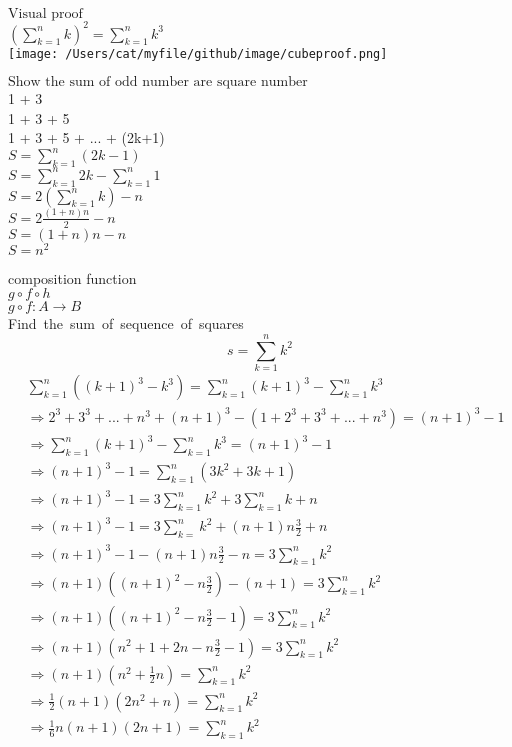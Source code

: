 \documentclass[10pt]{article}
\begin{document}
\begin{flushleft}
$\text{Visual proof}$\\
$ (\sum_{k=1}^{n} k)^{2} = \sum_{k=1}^{n} k^{3}$\\
\texttt{[image: /Users/cat/myfile/github/image/cubeproof.png]}
\end{flushleft}

\begin{flushleft}
$\text{Show the sum of odd number are square number}$
\\
1 + 3\\
1 + 3 + 5 \\
1 + 3 + 5 + ... + (2k+1) \\
\medskip
$S = \sum_{k=1}^{n} (2k-1)$ \\
$S = \sum_{k=1}^{n} 2k - \sum_{k=1}^{n} 1$ \\
$S = 2(\sum_{k=1}^{n} k) - n $ \\
$S = 2 \frac{(1+n)n}{2} - n$ \\
$S = (1+n)n - n$ \\
$S = n^2 $ \\
\end{flushleft}

composition function \\
$g \circ f \circ h $ \\
$g \circ f \colon A\to B$ \\

\pagebreak
\mbox{Find the sum of sequence of squares}
    \[ s = \sum_{k=1}^{n} k^2 \]
\begin{equation}
\begin{aligned}
    & \sum_{k=1}^{n} ((k+1)^3-k^3) = \sum_{k=1}^{n} (k+1)^3 - \sum_{k=1}^{n} k^3  \\
    & \Rightarrow 2^3 + 3^3 + ... + n^3 + (n+1)^3 - (1 + 2^3 + 3^3 + ... + n^3) = (n+1)^3 -1  \\
    & \Rightarrow  \sum_{k=1}^{n}(k+1)^3 - \sum_{k=1}^{n}k^3 =(n+1)^3 - 1  \\
    & \Rightarrow (n+1)^3-1 = \sum_{k=1}^{n}(3k^2+3k+1)   \\
    & \Rightarrow (n+1)^3-1 = 3\sum_{k=1}^{n} k^2 +  3\sum_{k=1}^{n} k + n   \\
    & \Rightarrow (n+1)^3-1 = 3\sum_{k=}^{n} k^2 + (n+1) n \frac{3}{2} + n  \\
    & \Rightarrow (n+1)^3-1 -  (n+1) n \frac{3}{2} - n= 3\sum_{k=1}^{n} k^2   \\
    & \Rightarrow (n+1)((n+1)^2-n \frac{3}{2})-(n+1) = 3\sum_{k=1}^{n} k^2  \\
    & \Rightarrow (n+1)( (n+1)^2 -n\frac{3}{2}-1) = 3\sum_{k=1}^{n} k^2  	 \\
    & \Rightarrow (n+1)( n^2+1+2n-n\frac{3}{2} - 1) = 3\sum_{k=1}^{n} k^2  	 \\
    & \Rightarrow (n+1)(n^2 + \frac{1}{2}n) = \sum_{k=1}^{n} k^2  \\
    & \Rightarrow \frac{1}{2}(n+1)(2n^2+n)=\sum_{k=1}^{n} k^2  \\
    & \Rightarrow \frac{1}{6}n(n+1)(2n+1) = \sum_{k=1}^{n} k^2  \nonumber \\
\end{aligned}
\end{equation}
\end{document}
